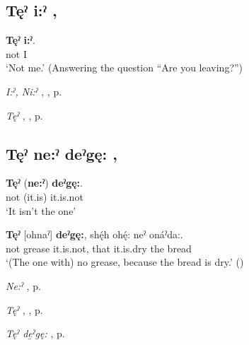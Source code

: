 \subsection*{\textbf{Tęˀ i:ˀ} , } \label{p:[tęˀ i:ˀ]}


\ea
\label{ex:tpart53}
\gll \textbf{Tęˀ} \textbf{i:ˀ}.\\
not I\\
\glt ‘Not me.’ (Answering the question “Are you leaving?”)
\z

\begin{CayugaRelated}
\item \textit{I:ˀ, Ni:ˀ} , , p. \pageref{p:[i:ˀ]}\\
\item \textit{Tęˀ} , , p. \pageref{p:[tęˀ]}
\end{CayugaRelated}

\subsection*{\textbf{Tęˀ ne:ˀ deˀgę:} , } \label{p:[tęˀ ne:ˀ deˀgę:]}

\ea
\label{ex:tpart54}
\gll \textbf{Tęˀ} (\textbf{ne:ˀ}) \textbf{deˀgę:}.\\
not (it.is) it.is.not\\
\glt ‘It isn’t the one’
\z

\ea
\label{ex:tpart55}
\gll \textbf{Tęˀ} [ohnaˀ] \textbf{deˀgę:}, shę́h ohę́: neˀ onáˀda:.\\
not grease it.is.not, that it.is.dry the bread\\
\glt ‘(The one with) no grease, because the bread is dry.’ (\cite{henry_de_2005})
\z

\begin{CayugaRelated}
\item \textit{Ne:ˀ} , p. \pageref{p:[ne:ˀ] `it is’}\\
\item \textit{Tęˀ} , , p. \pageref{p:[tęˀ]}\\
\item \textit{Tęˀ de̱ˀgę:} , p. \pageref{p:[tęˀ deˀgę:]}
\end{CayugaRelated}


